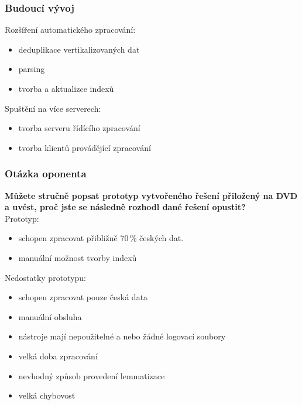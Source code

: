 \documentclass[10pt,xcolor=pdflatex]{beamer}
\begin{document}
\begin{frame}
  \frametitle{Budoucí vývoj}
  Rozšíření automatického zpracování:
  \begin{itemize}
      \item deduplikace vertikalizovaných dat
      \item parsing
      \item tvorba a aktualizce indexů
  \end{itemize}
  Spuštění na více serverech:
  \begin{itemize}
      \item tvorba serveru řídícího zpracování
      \item tvorba klientů provádějící zpracování
  \end{itemize}
\end{frame}


\appendix
\addtocounter{framenumber}{-\value{framenumber}} %

\begin{frame}
    \frametitle{Otázka oponenta}
    \textbf{Můžete stručně popsat prototyp vytvořeného řešení přiložený na DVD a uvést, proč jste se následně rozhodl dané řešení opustit?}\\[0.5cm]

    Prototyp:
    \begin{itemize}
        \item schopen zpracovat přibližně 70\,\% českých dat.
        \item manuální možnost tvorby indexů
	\end{itemize}
    Nedostatky prototypu:
    \begin{itemize}
        \item schopen zpracovat pouze česká data
        \item manuální obsluha
        \item nástroje mají nepoužitelné a nebo žádné logovací soubory
        \item velká doba zpracování
        \item nevhodný způsob provedení lemmatizace
        \item velká chybovost
	\end{itemize}
\end{frame}
\end{document}
